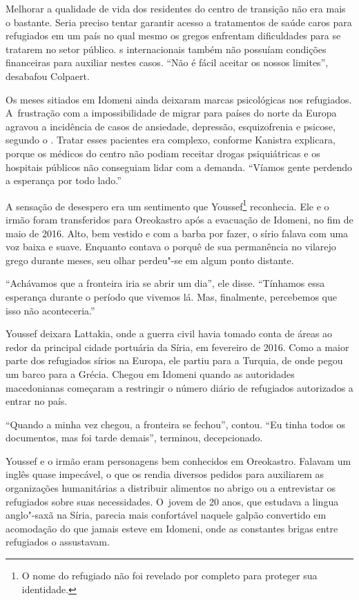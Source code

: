 Melhorar a qualidade de vida dos residentes do centro de transição não
era mais o bastante. Seria preciso tentar garantir acesso a tratamentos
de saúde caros para refugiados em um país no qual mesmo os gregos
enfrentam dificuldades para se tratarem no setor público. s
internacionais também não possuíam condições financeiras para auxiliar
nestes casos. ``Não é fácil aceitar os nossos limites'', desabafou
Colpaert.

Os meses sitiados em Idomeni ainda deixaram marcas psicológicas nos
refugiados. A~frustração com a impossibilidade de migrar para países do
norte da Europa agravou a incidência de casos de ansiedade, depressão,
esquizofrenia e psicose, segundo o . Tratar esses pacientes era
complexo, conforme Kanistra explicara, porque os médicos do centro não podiam receitar drogas psiquiátricas e os hospitais públicos não conseguiam lidar com a
demanda. ``Víamos gente perdendo a esperança por todo lado.''

A sensação de desespero era um sentimento que Youssef\footnote{ O nome do refugiado não foi revelado por completo
para proteger sua identidade.} 
reconhecia. Ele e o irmão foram transferidos para Oreokastro após a
evacuação de Idomeni, no fim de maio de 2016. Alto, bem vestido e com a
barba por fazer, o sírio falava com uma voz baixa e suave. Enquanto
contava o porquê de sua permanência no vilarejo grego durante meses, seu olhar
perdeu"-se em algum ponto distante.

``Achávamos que a fronteira iria se abrir um dia'', ele disse. ``Tínhamos
essa esperança durante o período que vivemos lá. Mas,
finalmente, percebemos que isso não aconteceria.''

Youssef deixara Lattakia, onde a guerra civil havia tomado conta de
áreas ao redor da principal cidade portuária da Síria, em fevereiro de
2016. Como a maior parte dos refugiados sírios na Europa, ele partiu para a
Turquia, de onde pegou um barco para a Grécia. Chegou em Idomeni quando
as autoridades macedonianas começaram a restringir o número diário de
refugiados autorizados a entrar no país.

``Quando a minha vez chegou, a fronteira se fechou'', contou. ``Eu
tinha todos os documentos, mas foi tarde demais'', terminou, decepcionado.

Youssef e o irmão eram personagens bem conhecidos em Oreokastro. Falavam
um inglês quase impecável, o que os rendia diversos pedidos para
auxiliarem as organizações humanitárias a distribuir alimentos no
abrigo ou a entrevistar os refugiados sobre suas necessidades. O~jovem
de 20 anos, que estudava a lingua anglo"-saxã na Síria, parecia mais
confortável naquele galpão convertido em acomodação do que jamais esteve
em Idomeni, onde as constantes brigas entre refugiados o assustavam.


